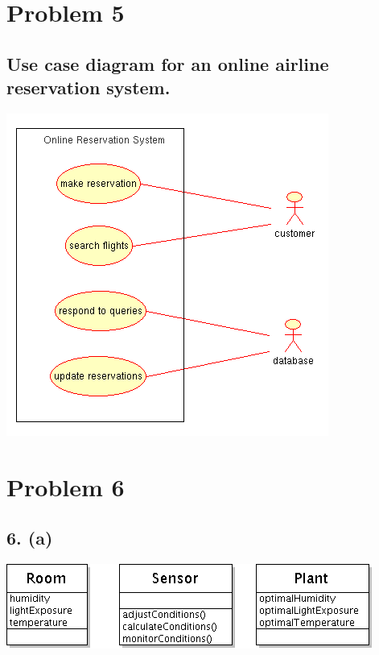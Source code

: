 \documentclass{article}[12pt]
\begin{document}
\section*{Problem 5}
  \subsection*{Use case diagram for an online airline reservation system.}
    \includegraphics[scale=0.5]{make_reservation(ucd).png}

\section*{Problem 6}

\subsection*{6. (a)}
\includegraphics[scale=0.45]{a1q6a.png}
\end{document}
